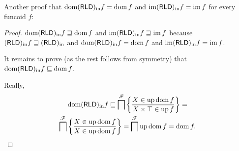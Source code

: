 Another proof that
$\dom\torldin f=\dom f$ and $\im\torldin f=\im f$ for every funcoid $f$:
\begin{proof}
$\dom\torldin f\sqsupseteq\dom f$ and $\im\torldin f\sqsupseteq\im f$
because $\torldin f\sqsupseteq\torldin$ and $\dom\torldin f=\dom f$
and $\im\torldin f=\im f$.

It remains to prove (as the rest follows from symmetry) that $\dom\torldin f\sqsubseteq\dom f$.

Really, 
\begin{multline*}
\dom\torldin f\sqsubseteq\bigsqcap^{\mathscr{F}}\setcond{X\in\up\dom f}{X\times\top\in\up f}=\\
\bigsqcap^{\mathscr{F}}\setcond{X\in\up\dom f}{X\in\up\dom f}=\bigsqcap^{\mathscr{F}}\up\dom f=\dom f.
\end{multline*}
\end{proof}


